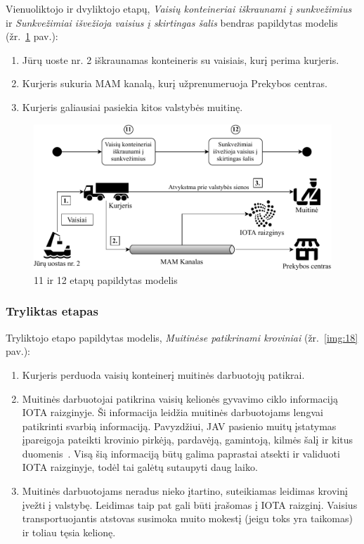 Vienuoliktojo ir dvyliktojo etapų, \textit{Vaisių konteineriai iškraunami į sunkvežimius} ir \textit{Sunkvežimiai išvežioja vaisius į skirtingas šalis} bendras papildytas modelis (žr.~\ref{img:17} pav.):
\begin{enumerate}
    \item Jūrų uoste nr. 2 iškraunamas konteineris su vaisiais, kurį perima kurjeris.
    \item Kurjeris sukuria MAM kanalą, kurį užprenumeruoja Prekybos centras.
    \item Kurjeris galiausiai pasiekia kitos valstybės muitinę.
\end{enumerate}

\begin{figure}[H]
    \centering
    \includegraphics[scale=0.8]{images/iota-usecase-11-12}
    \caption{11 ir 12 etapų papildytas modelis}
    \label{img:17}
\end{figure}




\subsubsection{Tryliktas etapas} \label{subsection:uc-13}

Tryliktojo etapo papildytas modelis, \textit{Muitinėse patikrinami kroviniai} (žr.~\ref{img:18} pav.):
\begin{enumerate}
    \item Kurjeris perduoda vaisių konteinerį muitinės darbuotojų patikrai.
    \item Muitinės darbuotojai patikrina vaisių kelionės gyvavimo ciklo informaciją IOTA raizginyje. Ši informacija leidžia muitinės darbuotojams lengvai patikrinti svarbią informaciją. Pavyzdžiui, JAV pasienio muitų įstatymas įpareigoja pateikti krovinio pirkėją, pardavėją, gamintoją, kilmės šalį ir kitus duomenis~\cite{customs2018importer}. Visą šią informaciją būtų galima paprastai atsekti ir validuoti IOTA raizginyje, todėl tai galėtų sutaupyti daug laiko. 
    \item Muitinės darbuotojams neradus nieko įtartino, suteikiamas leidimas krovinį įvežti į valstybę. Leidimas taip pat gali būti įrašomas į IOTA raizginį. Vaisius transportuojantis atstovas susimoka muito mokestį (jeigu toks yra taikomas) ir toliau tęsia kelionę.
\end{enumerate}

